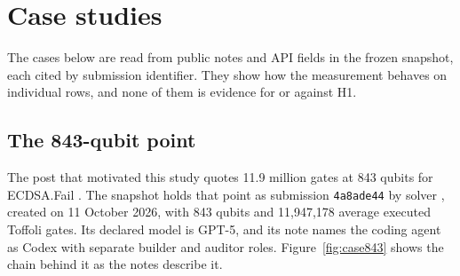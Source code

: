 \section{Case studies}
\label{sec:cases}

The cases below are read from public notes and API fields in the frozen snapshot, each cited by submission identifier.
They show how the measurement behaves on individual rows, and none of them is evidence for or against H1.

\subsection{The 843-qubit point}
\label{sec:case843}

The post that motivated this study quotes 11.9 million gates at 843 qubits for ECDSA.Fail \citep{kannan2026post}.
The snapshot holds that point as submission \texttt{4a8ade44} by solver , created on 11 October 2026, with 843 qubits and 11,947,178 average executed Toffoli gates.
Its declared model is GPT-5, and its note names the coding agent as Codex with separate builder and auditor roles.
Figure~\ref{fig:case843} shows the chain behind it as the notes describe it.

